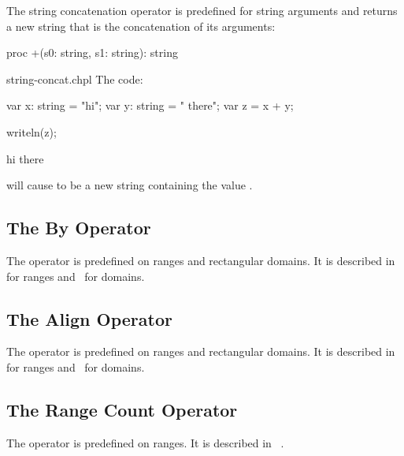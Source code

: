 The string concatenation operator \chpl{+} is predefined for string
arguments and returns a new string that is the concatenation of its
arguments:

\begin{chapel}
proc +(s0: string, s1: string): string
\end{chapel}

\begin{chapelexample}{string-concat.chpl}
The code:
\begin{chapel}
var x: string = "hi";
var y: string = " there";
var z = x + y;
\end{chapel}
\begin{chapelnoprint}
writeln(z);
\end{chapelnoprint}
\begin{chapeloutput}
hi there
\end{chapeloutput}
will cause  to be a new string containing the value .
\end{chapelexample}

\subsection{The By Operator}
\label{The_By_Operator}

The operator  is predefined on ranges and rectangular domains.
It is described in~ for ranges
and~ for domains.

\subsection{The Align Operator}
\label{The_Align_Operator}

The operator  is predefined on ranges and rectangular domains.
It is described in~ for ranges
and~ for domains.

\subsection{The Range Count Operator}
\label{The_Range_Count_Operator}

The operator \chpl{#} is predefined on ranges. It is described
in ~.


